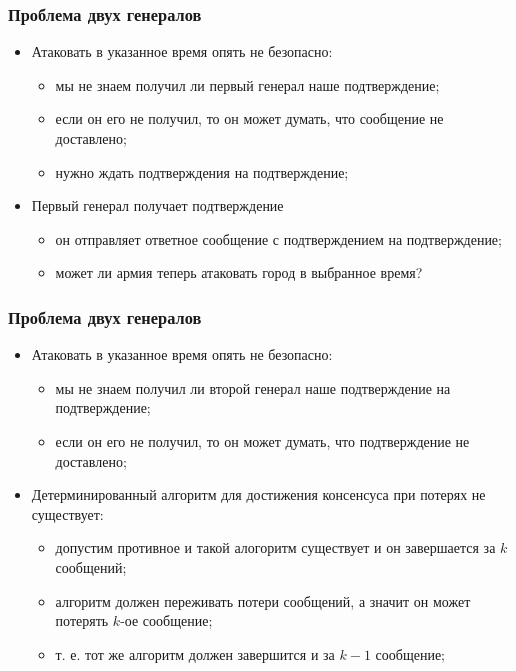 \begin{frame}
\frametitle{Проблема двух генералов}
\begin{itemize}
  \item<1-> Атаковать в указанное время опять не безопасно:
    \begin{itemize}
      \item мы не знаем получил ли первый генерал наше подтверждение;
      \item если он его не получил, то он может думать, что сообщение не доставлено;
      \item нужно ждать подтверждения на подтверждение;
    \end{itemize}
  \item<2-> Первый генерал получает подтверждение
    \begin{itemize}
      \item он отправляет ответное сообщение с подтверждением на подтверждение;
      \item может ли армия теперь атаковать город в выбранное время?
    \end{itemize}
\end{itemize}
\end{frame}

\begin{frame}
\frametitle{Проблема двух генералов}
\begin{itemize}
  \item<1-> Атаковать в указанное время опять не безопасно:
    \begin{itemize}
      \item мы не знаем получил ли второй генерал наше подтверждение на подтверждение;
      \item если он его не получил, то он может думать, что подтверждение не доставлено;
    \end{itemize}
  \item<2-> Детерминированный алгоритм для достижения консенсуса при потерях не существует:
    \begin{itemize}
      \item допустим противное и такой алогоритм существует и он завершается за $k$ сообщений;
      \item алгоритм должен переживать потери сообщений, а значит он может потерять $k$-ое сообщение;
      \item т. е. тот же алгоритм должен завершится и за $k-1$ сообщение;
    \end{itemize}
\end{itemize}
\end{frame}

